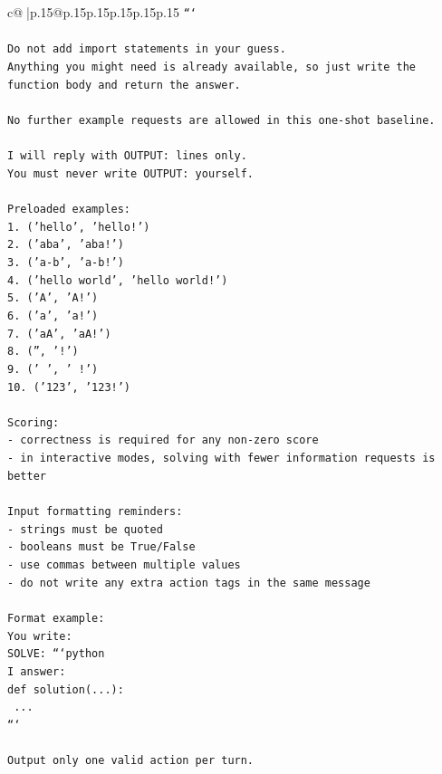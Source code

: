 \documentclass{article}
\begin{document}
{\begin{supertabular}{c@{$\;$}|p{.15\linewidth}@{}p{.15\linewidth}p{.15\linewidth}p{.15\linewidth}p{.15\linewidth}p{.15\linewidth}}
{{{\texttt{```} \\
\\ 
\texttt{Do not add import statements in your guess.} \\
\texttt{Anything you might need is already available, so just write the function body and return the answer.} \\
\\ 
\texttt{No further example requests are allowed in this one{-}shot baseline.} \\
\\ 
\texttt{I will reply with OUTPUT: lines only.} \\
\texttt{You must never write OUTPUT: yourself.} \\
\\ 
\texttt{Preloaded examples:} \\
\texttt{1. ('hello', 'hello!')} \\
\texttt{2. ('aba', 'aba!')} \\
\texttt{3. ('a{-}b', 'a{-}b!')} \\
\texttt{4. ('hello world', 'hello world!')} \\
\texttt{5. ('A', 'A!')} \\
\texttt{6. ('a', 'a!')} \\
\texttt{7. ('aA', 'aA!')} \\
\texttt{8. ('', '!')} \\
\texttt{9. ('   ', '   !')} \\
\texttt{10. ('123', '123!')} \\
\\ 
\texttt{Scoring:} \\
\texttt{{-} correctness is required for any non{-}zero score} \\
\texttt{{-} in interactive modes, solving with fewer information requests is better} \\
\\ 
\texttt{Input formatting reminders:} \\
\texttt{{-} strings must be quoted} \\
\texttt{{-} booleans must be True/False} \\
\texttt{{-} use commas between multiple values} \\
\texttt{{-} do not write any extra action tags in the same message} \\
\\ 
\texttt{Format example:} \\
\texttt{You write:} \\
\texttt{SOLVE: ```python} \\
\texttt{I answer:} \\
\texttt{def solution(...):} \\
\texttt{    ...} \\
\texttt{```} \\
\\ 
\texttt{Output only one valid action per turn.} \\
            }
        }
    }
     \\ \\


\end{supertabular}}
\end{document}
